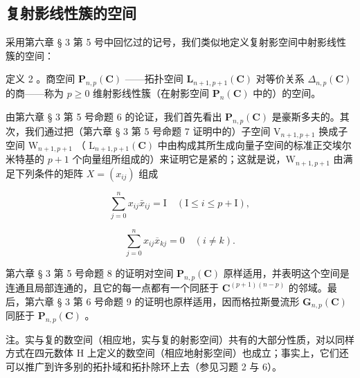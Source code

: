 \subsection{复射影线性簇的空间}

采用第六章 § 3 第 5 号中回忆过的记号，我们类似地定义复射影空间中射影线性簇的空间：

定义 2 。商空间 \(\mathbf{P}_{n,p}(\mathbf{C})\) ——拓扑空间 \(\mathbf{L}_{n+1, p+1}(\mathbf{C})\) 对等价关系 \(\Delta_{n,p}(\mathbf{C})\) 的商——称为 \(p \geqslant 0\) 维射影线性簇（在射影空间 \(\mathbf{P}_n(\mathbf{C})\) 中的）的空间。

由第六章 § 3 第 5 号命题 6 的论证，我们首先看出 \(\mathbf{P}_{n,p}(\mathbf{C})\) 是豪斯多夫的。其次，我们通过把（第六章 § 3 第 5 号命题 7 证明中的）子空间 \(\mathrm{V}_{n+1,p+1}\) 换成子空间 \(\mathrm{W}_{n+1,p+1}\) （ \(\mathrm{L}_{n+1,p+1}(\mathbf{C})\) 中由构成其所生成向量子空间的标准正交埃尔米特基的 \(p+1\) 个向量组所组成的）来证明它是紧的；这就是说，\(\mathrm{W}_{n+1,p+1}\) 由满足下列条件的矩阵 \(X=(x_{ij})\) 组成

\[
\sum_ {j = 0} ^ {n} x _ {i j} \bar {x} _ {i j} = \mathrm{I} \quad (\mathrm{I} \leqslant i \leqslant p + \mathrm{I}),
\]

\[
\sum_ {j = 0} ^ {n} x _ {i j} \overline {{{x}}} _ {k j} = 0 \quad (i \neq k).
\]

第六章 § 3 第 5 号命题 8 的证明对空间 \(\mathbf{P}_{n,p}(\mathbf{C})\) 原样适用，并表明这个空间是连通且局部连通的，且它的每一点都有一个同胚于 \(\mathbf{C}^{(p+1)(n-p)}\) 的邻域。最后，第六章 § 3 第 6 号命题 9 的证明也原样适用，因而格拉斯曼流形 \(\mathbf{G}_{n,p}(\mathbf{C})\) 同胚于 \(\mathbf{P}_{n,p}(\mathbf{C})\) 。

注。实与复的数空间（相应地，实与复的射影空间）共有的大部分性质，对以同样方式在四元数体 H 上定义的数空间（相应地射影空间）也成立；事实上，它们还可以推广到许多别的拓扑域和拓扑除环上去（参见习题 2 与 6）。

\ExerciseGroupsStart
\relax{}
